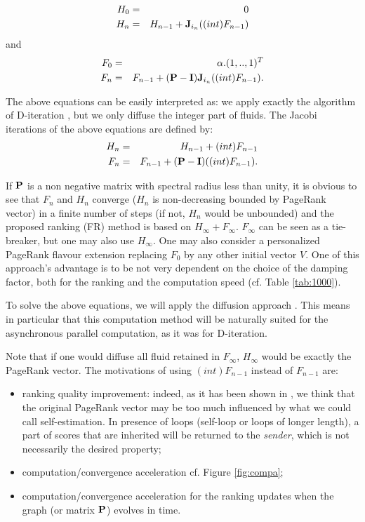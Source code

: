 \documentclass[conference]{IEEEtran}
\def\Pb{\bold{P}}
\def\Ib{\bold{I}}
\def\Jb{\bold{J}}
\begin{document}
\begin{psfrags}
\begin{eqnarray}
H_0 &=& 0\nonumber\\
H_n &=& H_{n-1} + \Jb_{i_n} ((int)F_{n-1})\label{eq:defHex}
\end{eqnarray}
and
\begin{eqnarray}
F_0 &=& \alpha . (1,..,1)^T\nonumber\\
F_n &=& F_{n-1} + (\Pb - \Ib) \Jb_{i_n} ((int)F_{n-1}).\label{eq:defFex}
\end{eqnarray}

The above equations can be easily interpreted as: we apply exactly the algorithm of
D-iteration \cite{d-algo}, but we only diffuse the integer part of fluids.
The Jacobi iterations of the above equations are defined by:
\begin{eqnarray*}
H_n &=& H_{n-1} + (int)F_{n-1}\\
F_n &=& F_{n-1} + (\Pb - \Ib) ((int)F_{n-1}).
\end{eqnarray*}

If $\Pb$ is a non negative matrix with spectral radius less than unity, 
it is obvious to see that $F_n$ and $H_n$ converge ($H_n$ is non-decreasing bounded by PageRank vector)
in a finite number of steps (if not, $H_n$ would be unbounded) and the proposed ranking (FR)
method is based on $H_{\infty}+F_{\infty}$. $F_{\infty}$ can be seen as a tie-breaker, but one may also use $H_{\infty}$.
One may also consider a personalized PageRank flavour extension replacing $F_0$
by any other initial vector $V$.
One of this approach's advantage is to be not very dependent on the choice
of the damping factor, both for the ranking and the computation speed (cf. Table \ref{tab:1000}).

To solve the above equations, we will apply the diffusion approach \cite{d-algo}.
This means in particular that this computation method will be naturally suited for the asynchronous
parallel computation, as it was for D-iteration.

Note that if one would diffuse all fluid retained in $F_{\infty}$, $H_{\infty}$ would be
exactly the PageRank vector. The motivations of using $(int)F_{n-1}$ instead of
$F_{n-1}$ are:
\begin{itemize}
\item ranking quality improvement: indeed, as it has been shown in \cite{diversity}, we
  think that the original PageRank vector may be too much influenced by what we could call
  self-estimation. In presence of loops (self-loop or loops of longer length), a
  part of scores that are inherited will be returned to the {\em sender}, which is not
  necessarily the desired property;
\item computation/convergence acceleration cf. Figure \ref{fig:compa};
\item computation/convergence acceleration for the ranking updates when the graph
 (or matrix $\Pb$) evolves in time.
\end{itemize}


\end{psfrags}
\end{document}
